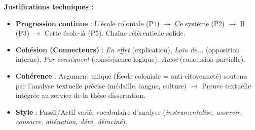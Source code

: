 \documentclass[11pt]{article}
\newcommand{\cle}[1]{{\popxbold\color{popdark}#1}}
\begin{document}
\begin{exoresolu}
    \textbf{Justifications techniques :}
    \begin{itemize}
        \item \textbf{Progression continue} : \cle{L'école coloniale} (P1) $\rightarrow$ \cle{Ce système} (P2) $\rightarrow$ \cle{Il} (P3) $\rightarrow$ \cle{Cette école-là} (P5). Chaîne référentielle solide.
        \item \textbf{Cohésion (Connecteurs)} : \emph{En effet} (explication), \emph{Loin de...} (opposition interne), \emph{Par conséquent} (conséquence logique), \emph{Aussi} (conclusion partielle).
        \item \textbf{Cohérence} : Argument unique (École coloniale = anti-citoyenneté) soutenu par l'analyse textuelle précise (médaille, langue, culture) $\rightarrow$ Preuve textuelle intégrée au service de la thèse dissertation.
        \item \textbf{Style} : Passif/Actif varié, vocabulaire d'analyse (\emph{instrumentalise, asservir, consacre, aliénation, déni, déraciné}).
    \end{itemize}
\end{exoresolu}
\end{document}
